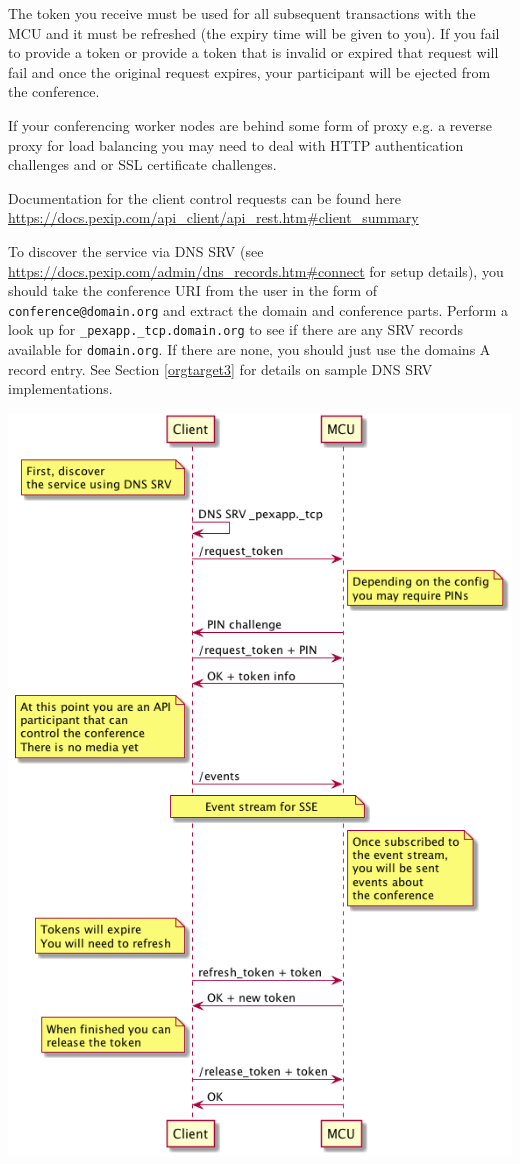 \documentclass[a4paper,11pt]{article}
\begin{document}
The token you receive must be used for all subsequent transactions
with the MCU and it must be refreshed (the expiry time will be given
to you).  If you fail to provide a token or provide a token that is
invalid or expired that request will fail and once the original
request expires, your participant will be ejected from the conference.

If your conferencing worker nodes are behind some form of proxy
e.g. a reverse proxy for load balancing you may need to deal with HTTP
authentication challenges and or SSL certificate challenges.

Documentation for the client control requests can be found here
\url{https://docs.pexip.com/api_client/api_rest.htm#client_summary}

To discover the service via DNS SRV (see
\url{https://docs.pexip.com/admin/dns_records.htm#connect} for setup
details), you should take the conference URI from the user in the form
of \texttt{conference@domain.org} and extract the domain and conference
parts.  Perform a look up for \texttt{\_pexapp.\_tcp.domain.org} to see if
there are any SRV records available for \texttt{domain.org}.  If there are
none, you should just use the domains A record entry.  See Section
\ref{orgtarget3} for details on sample DNS SRV implementations.

\includegraphics[width=.9\linewidth]{images/request_token_sequence.png}
\end{document}
